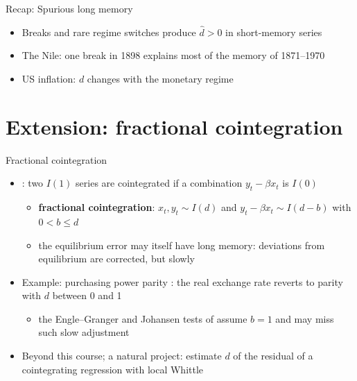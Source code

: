 \begin{frame}{Recap: Spurious long memory}
\itemsize{\small}
\begin{itemize}
    \item Breaks and rare regime switches produce $\hat d > 0$ in short-memory series
    \item The Nile: one break in 1898 explains most of the memory of 1871--1970
    \item US inflation: $d$ changes with the monetary regime
\end{itemize}
\end{frame}


\section{Extension: fractional cointegration}

\begin{frame}{Fractional cointegration}
\itemsize{\small}
\begin{itemize}
    \item {}: two $I(1)$ series are cointegrated if a combination $y_t - \beta x_t$ is $I(0)$
    \begin{itemize}
        \item \textbf{fractional cointegration}: $x_t, y_t \sim I(d)$ and $y_t - \beta x_t \sim I(d - b)$ with $0 < b \le d$
        \item the equilibrium error may itself have long memory: deviations from equilibrium are corrected, but slowly
    \end{itemize}
    \item Example: purchasing power parity : the real exchange rate reverts to parity with $d$ between 0 and 1
    \begin{itemize}
        \item the Engle--Granger and Johansen tests of  assume $b = 1$ and may miss such slow adjustment
    \end{itemize}
    \item Beyond this course; a natural project: estimate $d$ of the residual of a cointegrating regression with local Whittle
\end{itemize}
\end{frame}


